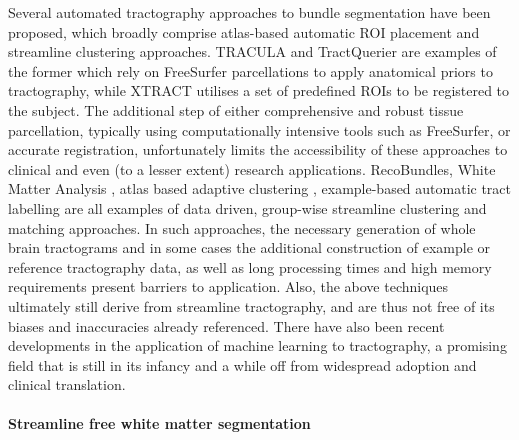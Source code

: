 Several automated tractography approaches to bundle segmentation have been proposed, which broadly comprise atlas-based automatic ROI placement and streamline clustering approaches.
TRACULA and TractQuerier are examples of the former which rely on FreeSurfer parcellations to apply anatomical priors to tractography, while XTRACT \autocite{Warrington2020} utilises a set of predefined ROIs to be registered to the subject.
The additional step of either comprehensive and robust tissue parcellation, typically using computationally intensive tools such as FreeSurfer, or accurate registration, unfortunately limits the accessibility of these approaches to clinical and even (to a lesser extent) research applications.
RecoBundles,\autocite{Garyfallidis2018} White Matter Analysis \autocite{ODonnell2017, ODonnell2007}, atlas based adaptive clustering \autocite{Tunc2014}, example-based automatic tract labelling \autocite{Yoo2015} are all examples of data driven, group-wise streamline clustering and matching approaches.
In such approaches, the necessary generation of whole brain tractograms and in some cases the additional construction of example or reference tractography data, as well as long processing times and high memory requirements\autocite{Wasserthal2018} present barriers to application.
Also, the above techniques ultimately still derive from streamline tractography, and are thus not free of its biases and inaccuracies already referenced.
There have also been recent developments in the application of machine learning to tractography,\autocite{Poulin2019} a promising field that is still in its infancy and a while off from widespread adoption and clinical translation.

\paragraph*{Streamline free white matter segmentation}


